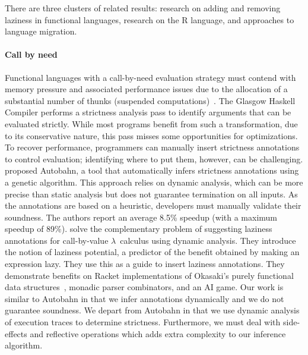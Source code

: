 \documentclass[screen,acmsmall]{acmart}
\begin{document}
There are three clusters of related results: research on adding and removing
laziness in functional languages, research on the R language, and approaches to
language migration.

\paragraph{Call by need} Functional languages with a call-by-need evaluation
strategy must contend with memory pressure and associated performance issues due
to the allocation of a substantial number of thunks (suspended
computations)~\cite{transformopt,stricteffective,opteval}. The Glasgow Haskell
Compiler performs a strictness analysis pass to identify arguments that can be
evaluated strictly. While most programs benefit from such a transformation, due
to its conservative nature, this pass misses some opportunities for
optimizations. To recover performance, programmers can manually insert
strictness annotations to control evaluation; identifying where to put them,
however, can be challenging. \citet{autobahn} proposed Autobahn, a tool that
automatically infers strictness annotations using a genetic algorithm. This
approach relies on dynamic analysis, which can be more precise than static
analysis but does not guarantee termination on all inputs. As the annotations
are based on a heuristic, developers must manually validate their soundness. The
authors report an average 8.5\% speedup (with a maximum speedup of 89\%).
\citet{lazyprof} solve the complementary problem of suggesting laziness
annotations for call-by-value $\lambda$~calculus using dynamic analysis. They
introduce the notion of laziness potential, a predictor of the benefit obtained
by making an expression lazy. They use this as a guide to insert laziness
annotations. They demonstrate benefits on Racket implementations of Okasaki's
purely functional data structures~\cite{oka95}, monadic parser combinators, and
an AI game. Our work is similar to Autobahn in that we infer annotations
dynamically and we do not guarantee soundness. We depart from Autobahn in that
we use dynamic analysis of execution traces to determine strictness.
Furthermore, we must deal with side-effects and reflective operations which adds
extra complexity to our inference algorithm.
\end{document}
